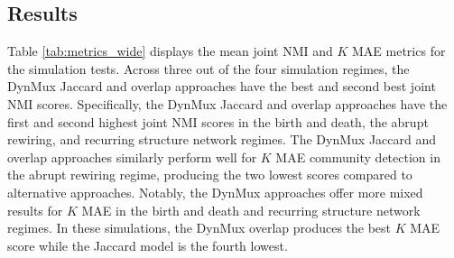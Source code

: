 \documentclass[11pt, letterpaper]{article}
\begin{document}
\subsection{Results}
Table \ref{tab:metrics_wide} displays the mean joint NMI and $K$ MAE metrics for the simulation tests. Across three out of the four simulation regimes, the DynMux Jaccard and overlap approaches have the best and second best joint NMI scores. Specifically, the DynMux Jaccard and overlap approaches have the first and second highest joint NMI scores in the birth and death, the abrupt rewiring, and recurring structure network regimes. The DynMux Jaccard and overlap approaches similarly perform well for $K$ MAE community detection in the abrupt rewiring regime, producing the two lowest scores compared to alternative approaches. Notably, the DynMux approaches offer more mixed results for $K$ MAE in the birth and death and recurring structure network regimes. In these simulations, the DynMux overlap produces the best $K$ MAE score while the Jaccard model is the fourth lowest.
\end{document}
